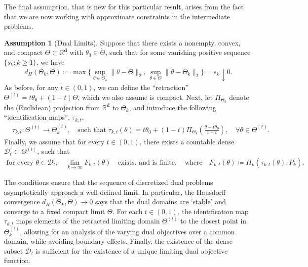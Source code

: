 \documentclass{article}
\theoremstyle{plain}
\theoremstyle{definition}
\newtheorem{assumption}[assumption]{Assumption}
\newcommand{\lrp}[1]{\left( #1 \right)}
\newcommand{\R}{\mathbb{R}}
\newcommand{\calD}{\mathcal D}
\newcommand{\dvec}{\mathbf{d}}
\newcommand{\qtext}[1]{\quad \text{#1} \quad}
\begin{document}
The final assumption, that is new for this particular result, arises from the fact that we are now working with approximate constraints in the intermediate problems. 
\begin{assumption}[Dual Limits]
    \label{assump:general-dual-limits}
    Suppose that there exists a nonempty, convex, and compact $\Theta \subset \R^{\dvec}$ with $\theta_0 \in \mathring{\Theta}$, such that  for some vanishing positive sequence $\{s_k: k \geq 1\}$, we have 
    \begin{align}
        d_H(\Theta_k, \Theta) \coloneqq \max \big\{ \sup_{\theta \in \Theta_k} \|\theta - \Theta\|_2, \, \sup_{\theta \in \Theta}  \|\theta - \Theta_k\|_2 \big\} = s_k \downarrow 0. 
    \end{align}
    As before,  for any $t\in (0,1)$, we can define the ``retraction'' $\Theta^{(t)} = t \theta_0 + (1 - t) \Theta$, which we also assume is compact. 
    Next, let $\Pi_{\Theta_k}$%
    denote the (Euclidean) projection from $\R^{\dvec}$ to $\Theta_k$, and introduce the following ``identification maps'', $\tau_{k,t}$,
    \begin{align}
        &\tau_{k,t}: \Theta^{(t)} \to \Theta_k^{(t)}, \quad \text{such that } \tau_{k,t}(\theta) = t \theta_0 + (1-t) \Pi_{\Theta_k}\lrp{\frac{\theta - t \theta_0}{1-t} }, \quad \forall \theta \in \Theta^{(t)}. \label{eq:tau-k-t-def} %
    \end{align}
     Finally, we assume that for every $t \in (0,1)$, there exists a countable dense $\calD_t \subset \Theta^{(t)}$, such that  
     \begin{align}
         \text{for every } \theta \in \calD_t, \quad \lim_{k \to \infty} {F_{k,t}(\theta)}  \quad \text{exists, and is finite}, \qtext{where} F_{k,t}(\theta) \coloneqq H_k(\tau_{k,t}(\theta), P_k). 
     \end{align}
\end{assumption}
The conditions ensure that the sequence of discretized dual problems asymptotically approach a well-defined limit. In particular, the Hausdorff convergence $d_H(\Theta_k, \Theta) \to 0$ says that the dual  domains are `stable' and converge to a fixed compact limit $\Theta$. For each $t \in (0,1)$, the identification map $\tau_{k,t}$ maps elements of the retracted limiting domain $\Theta^{(t)}$ to the closest point in $\Theta_k^{(t)}$, allowing for an analysis of the varying dual objectives over a common domain, while avoiding boundary effects. Finally, the existence of the dense subset $\calD_t$ is sufficient for the existence of a unique limiting dual objective function.  
\end{document}
